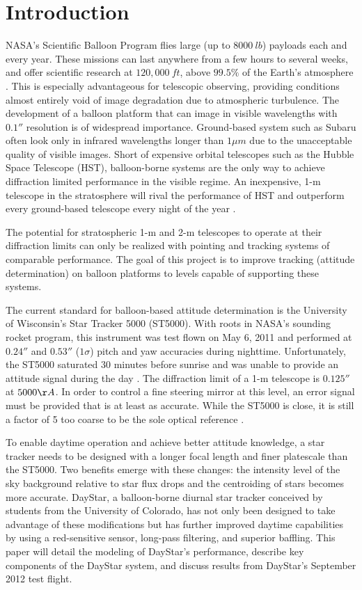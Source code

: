 \documentclass[twocolumn,letterpaper]{IEEEAerospace2012}
\begin{document}
\section{Introduction}
NASA's Scientific Balloon Program flies large (up to $8000 \ lb$) payloads each and every year. These missions can last anywhere from a few hours to several weeks, and offer scientific research at $120,000 \ ft$, above $99.5\%$ of the Earth's atmosphere \cite{young2012}. This is especially advantageous for telescopic observing, providing conditions almost entirely void of image degradation due to atmospheric turbulence. The development of a balloon platform that can image in visible wavelengths with $0.1''$ resolution is of widespread importance. Ground-based system such as Subaru often look only in infrared wavelengths longer than $1 \mu m$ due to the unacceptable quality of visible images. Short of expensive orbital telescopes such as the Hubble Space Telescope (HST), balloon-borne systems are the only way to achieve diffraction limited performance in the visible regime. An inexpensive, 1-m telescope in the stratosphere will rival the performance of HST and outperform every ground-based telescope every night
of the year \cite{young2012}.

The potential for stratospheric 1-m and 2-m telescopes to operate at their diffraction limits can only be realized with pointing and tracking systems of comparable performance. The goal of this project is to improve tracking (attitude determination) on balloon platforms to levels capable of supporting these systems.

The current standard for balloon-based attitude determination is the University of Wisconsin's Star Tracker 5000 (ST5000). With roots in NASA's sounding rocket program, this instrument was test flown on May 6, 2011 and performed at $0.24''$ and $0.53''$ ($1\sigma$) pitch and yaw accuracies during nighttime. Unfortunately, the ST5000 saturated 30 minutes before sunrise and was unable to provide an attitude signal during the day \cite{young2012}. The diffraction limit of a 1-m telescope is $0.125''$ at $5000 \AA{}$. In order to control a fine steering mirror at this level, an error signal must be provided that is at least as accurate. While the ST5000 is close, it is still a factor of 5 too coarse to be the sole optical reference \cite{young2012}.

To enable daytime operation and achieve better attitude knowledge, a star tracker needs to be designed with a longer focal length and finer platescale than the ST5000. Two benefits emerge with these changes: the intensity level of the sky background relative to star flux drops and the centroiding of stars becomes more accurate. DayStar, a balloon-borne diurnal star tracker conceived by students from the University of Colorado, has not only been designed to take advantage of these modifications but has further improved daytime capabilities by using a red-sensitive sensor, long-pass filtering, and superior baffling. This paper will detail the modeling of DayStar's performance, describe key components of the DayStar system, and discuss results from DayStar's September 2012 test flight.
\end{document}
